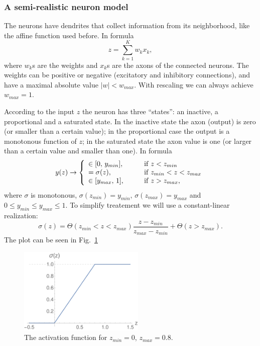 \documentclass[10pt,a4paper]{article}
\begin{document}
\subsubsection{A semi-realistic neuron model}

The neurons have dendrites that collect information from its neighborhood, like the affine function used before. In formula
\begin{equation}
  \label{eq:z}
  z = \sum_{k=1}^K w_k x_k,
\end{equation}
where $w_k$s are the weights and $x_k$s are the axons of the connected neurons. The weights can be positive or negative (excitatory and inhibitory connections), and have a maximal absolute value $|w|<w_{max}$. With rescaling we can always achieve $w_{max}=1$. 

According to the input $z$ the neuron has three ``states'': an inactive, a proportional and a saturated state. In the inactive state the axon (output) is zero (or smaller than a certain value); in the proportional case the output is a monotonous function of $z$; in the saturated state the axon value is one (or larger than a certain value and smaller than one). In formula
\begin{equation}
  y(z) \rightarrow \left\{
    \begin{array}[c]{ll}
      \in [0,\,y_{min}],\qquad& \mathrm{if}\; z<z_{min}\cr
      =\sigma(z),\qquad &\mathrm{if}\; z_{min}<z<z_{max}\cr
      \in [y_{max},\,1],\qquad& \mathrm{if}\; z>z_{max},\cr
    \end{array}
  \right.
\end{equation}
where $\sigma$ is monotonous, $\sigma(z_{min})=y_{min},\, \sigma(z_{max})=y_{max}$ and $0\le y_{min}\le y_{max}\le1$. To simplify treatement we will use a constant-linear realization:
\begin{equation}
  \sigma(z) = \Theta(z_{min}<z<z_{max}) \frac{z-z_{min}}{z_{max}-z_{min}} + \Theta(z>z_{max}).
\end{equation}
The plot can be seen in Fig.~\ref{fig:actfunc1}
\begin{figure}[htbp]
  \label{fig:actfunc1}
  \centerline{\includegraphics[width=6cm]{actfunc1}}
  \caption{The activation function for $z_{min}=0$, $z_{max}=0.8$.}
\end{figure}
\end{document}
